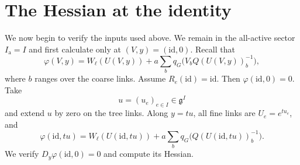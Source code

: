 \documentclass[10pt,reqno]{amsart}
\theoremstyle{definition}
\theoremstyle{remark}
\numberwithin{equation}{section}
\numberwithin{figure}{section}
\newcommand{\g}{\mathfrak g}
\newcommand{\id}{\mathrm{id}}
\begin{document}
\section{The Hessian at the identity}\label{sec:identity-hessian}
We now begin to verify the inputs used above. We remain in the all-active
sector $I_{\mathrm a}=I$ and first calculate only at $(V,y)=(\id,0)$.
Recall that
\begin{equation}\label{eq:identity-action}
\varphi(V,y)=W_\ell(U(V,y))
+a\sum_bq_G\bigl(V_bQ(U(V,y))_b^{-1}\bigr),
\end{equation}
where $b$ ranges over the coarse links. Assume $R_e(\id)=\id$.
Then $\varphi(\id,0)=0$. Take
\begin{equation}\label{eq:identity-variation}
u=(u_e)_{e\in I}\in\g^I
\end{equation}
and extend $u$ by zero on the tree links. Along $y=tu$, all fine links
are $U_e=e^{tu_e}$, and
\begin{equation}\label{eq:identity-varied-action}
\varphi(\id,tu)=W_\ell(U(\id,tu))
+a\sum_bq_G\bigl(Q(U(\id,tu))_b^{-1}\bigr).
\end{equation}
We verify $D_y\varphi(\id,0)=0$ and compute its Hessian.
\end{document}
